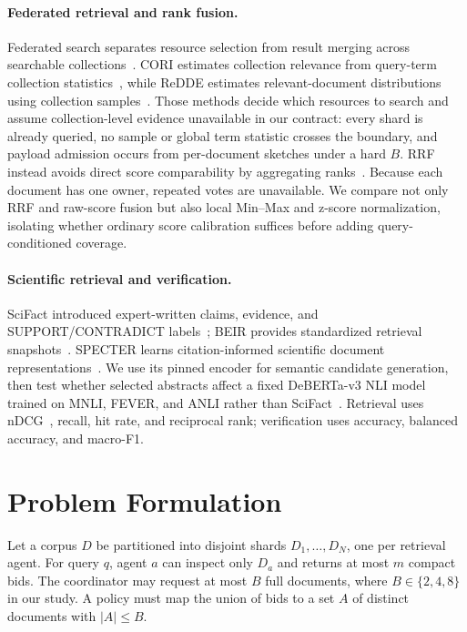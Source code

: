 \documentclass[sigconf]{acmart}
\newcommand{\ndcg}{nDCG}
\begin{document}
\paragraph{Federated retrieval and rank fusion.}
Federated search separates resource selection from result merging across searchable collections~\cite{shokouhi2011federated}. CORI estimates collection relevance from query-term collection statistics~\cite{callan1995distributed}, while ReDDE estimates relevant-document distributions using collection samples~\cite{si2003redde}. Those methods decide which resources to search and assume collection-level evidence unavailable in our contract: every shard is already queried, no sample or global term statistic crosses the boundary, and payload admission occurs from per-document sketches under a hard $B$. RRF instead avoids direct score comparability by aggregating ranks~\cite{cormack2009rrf}. Because each document has one owner, repeated votes are unavailable. We compare not only RRF and raw-score fusion but also local Min--Max and z-score normalization, isolating whether ordinary score calibration suffices before adding query-conditioned coverage.

\paragraph{Scientific retrieval and verification.}
SciFact introduced expert-written claims, evidence, and SUPPORT/CONTRADICT labels~\cite{wadden2020scifact}; BEIR provides standardized retrieval snapshots~\cite{thakur2021beir}. SPECTER learns citation-informed scientific document representations~\cite{cohan2020specter}. We use its pinned encoder for semantic candidate generation, then test whether selected abstracts affect a fixed DeBERTa-v3 NLI model trained on MNLI, FEVER, and ANLI rather than SciFact~\cite{he2021debertav3,williams2018mnli,thorne2018fever,nie2020anli}. Retrieval uses \ndcg{}~\cite{jarvelin2002ndcg}, recall, hit rate, and reciprocal rank; verification uses accuracy, balanced accuracy, and macro-F1.

\section{Problem Formulation}

Let a corpus $D$ be partitioned into disjoint shards $D_1,\ldots,D_N$, one per retrieval agent. For query $q$, agent $a$ can inspect only $D_a$ and returns at most $m$ compact bids. The coordinator may request at most $B$ full documents, where $B\in\{2,4,8\}$ in our study. A policy must map the union of bids to a set $A$ of distinct documents with $|A|\leq B$.
\end{document}
